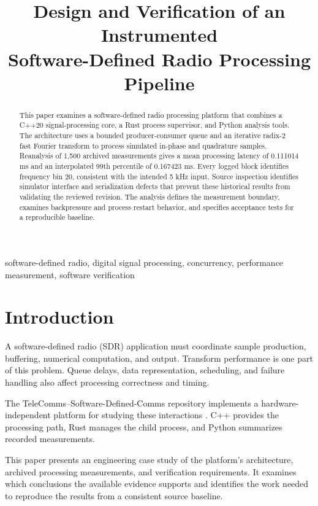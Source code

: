 \documentclass[conference]{IEEEtran}
\title{Design and Verification of an Instrumented\\
Software-Defined Radio Processing Pipeline}
\author{
\IEEEauthorblockN{Tyree Franklin Jr.}
\IEEEauthorblockA{
Computer Science\\
Western Governors University}
}
\begin{document}
\maketitle

\begin{abstract}
This paper examines a software-defined radio processing
platform that combines a C++20 signal-processing core,
a Rust process supervisor, and Python analysis tools.
The architecture uses a bounded producer-consumer queue
and an iterative radix-2 fast Fourier transform to process
simulated in-phase and quadrature samples.
Reanalysis of 1,500 archived measurements gives a mean
processing latency of 0.111014 ms and an interpolated
99th percentile of 0.167423 ms. Every logged block identifies
frequency bin 20, consistent with the intended 5 kHz input.
Source inspection identifies simulator interface and
serialization defects that prevent these historical results
from validating the reviewed revision.
The analysis defines the measurement boundary, examines
backpressure and process restart behavior, and specifies
acceptance tests for a reproducible baseline.
\end{abstract}

\begin{IEEEkeywords}
software-defined radio, digital signal processing,
concurrency, performance measurement, software verification
\end{IEEEkeywords}

\section{Introduction}

A software-defined radio (SDR) application must coordinate
sample production, buffering, numerical computation, and
output. Transform performance is one part of this problem.
Queue delays, data representation, scheduling, and failure
handling also affect processing correctness and timing.

The TeleComms--Software-Defined-Comms repository implements
a hardware-independent platform for studying these
interactions \cite{repo}. C++ provides the processing path,
Rust manages the child process, and Python summarizes
recorded measurements.

This paper presents an engineering case study of the
platform's architecture, archived processing measurements,
and verification requirements. It examines which conclusions
the available evidence supports and identifies the work
needed to reproduce the results from a consistent source
baseline.
\end{document}
